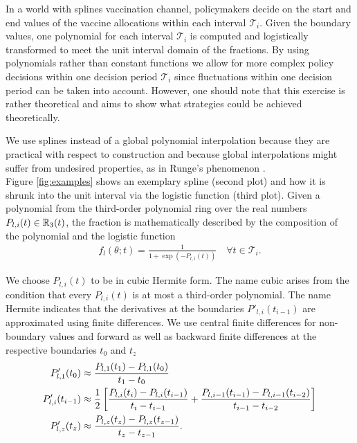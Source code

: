 In a world with splines vaccination channel, policymakers decide on the start and end values of the vaccine allocations within each interval $\mathcal{T}_i$. Given the boundary values, one polynomial for each interval $\mathcal{T}_i$ is computed and logistically transformed to meet the unit interval domain of the fractions. By using polynomials rather than constant functions we allow for more complex policy decisions within one decision period $\mathcal{T}_i$ since fluctuations within one decision period can be taken into account. However, one should note that this exercise is rather theoretical and aims to show what strategies could be achieved theoretically.

We use splines instead of a global polynomial interpolation because they are practical with respect to construction and because global interpolations might suffer from undesired properties, as in Runge's phenomenon \citep{Runge.1901}.\\
 
%
Figure \ref{fig:examples} shows an exemplary spline (second plot) and how it is shrunk into the unit interval via the logistic function (third plot). %
Given a polynomial from the third-order polynomial ring over the real numbers $P_{l,i}(t) \in \mathbb{R}_3(t)$, the fraction is mathematically described by the composition of the polynomial and the logistic function
\begin{align}
f_{l}(\theta; t) =  \frac{1}{1 + \exp{(-P_{l,i}(t))}} \quad \forall t \in \mathcal{T}_i. 
\end{align}

We choose $P_{l,i}(t)$ to be in cubic Hermite form. The name cubic arises from the condition that every $P_{l,i}(t)$ is at most a third-order polynomial. The name Hermite indicates that the derivatives at the boundaries $P'_{l,i}(t_{i-1})$ are approximated using finite differences. We use central finite differences for non-boundary values and forward as well as backward finite differences at the respective boundaries $t_0$ and $t_{z}$
\begin{align}
\label{eq:finite_differences}
P'_{l,1}(t_0) &\approx \frac{P_{l,1}(t_1) - P_{l,1}(t_0)}{t_1 - t_0} \\
P'_{l,i}(t_{i-1}) &\approx \frac{1}{2}\left[\frac{P_{l,i}(t_{i}) - P_{l,i}(t_{i-1})}{t_{i} - t_{i-1}} + \frac{P_{l,i-1}(t_{i-1}) - P_{l,i-1}( t_{i-2})}{t_{i-1} - t_{i-2}} \right] \notag \\
P'_{l,z}(t_{z}) &\approx \frac{P_{l,z}(t_{z}) - P_{l,z}(t_{z-1})}{t_{z} - t_{z-1}} \notag .
\end{align}

